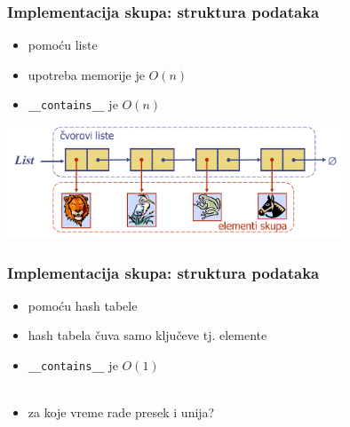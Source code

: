 \documentclass[compress]{beamer}
\begin{document}
\begin{frame}[fragile]
  \frametitle{Implementacija skupa: struktura podataka}
  \begin{itemize}
    \item pomoću liste
    \item upotreba memorije je $O(n)$
    \item \texttt{\_\_contains\_\_} je $O(n)$
  \end{itemize} 
  \begin{center}
    \includegraphics[width=10cm]{asp-10-pic16.png}
  \end{center}
\end{frame}

\begin{frame}[fragile]
  \frametitle{Implementacija skupa: struktura podataka}
  \begin{itemize}
    \item pomoću hash tabele
    \item hash tabela čuva samo ključeve tj. elemente
    \item \texttt{\_\_contains\_\_} je $O(1)$ \\ \ \\
    \item za koje vreme rade presek i unija?
  \end{itemize} 
\end{frame}
\end{document}
